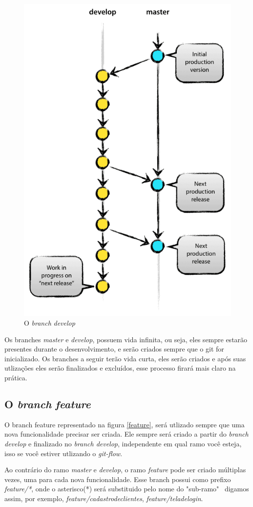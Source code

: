 \documentclass[12pt,openright,oneside,a4paper,english,brazil]{abntex2}
\begin{document}
\begin{figure}[h]
	\caption{\label{develop}O \textit{branch} \textit{develop}}
	\begin{center}
		\includegraphics[width=0.6\linewidth]{develop}
	\end{center}
\end{figure}
	
Os branches \textit{master} e \textit{develop}, possuem vida infinita, ou seja, eles sempre estarão presentes durante o desenvolvimento, e serão criados sempre que o git for inicializado. Os branches a seguir terão vida curta, eles serão criados e após suas utlizações eles serão finalizados e excluídos, esse processo firará mais claro na prática.

\subsection{O \textit{branch} \textit{feature}}

O branch feature representado na figura \ref{feature}, será utlizado sempre que uma nova funcionalidade precisar ser criada. Ele sempre será criado a partir do\textit{ branch develop} e finalizado no \textit{branch develop}, independente em qual ramo você esteja, isso se você estiver utlizando o \textit{git-flow}.

Ao contrário do ramo \textit{master} e \textit{develop}, o ramo \textit{feature} pode ser criado múltiplas vezes, uma para cada nova funcionalidade. Esse branch possui como prefixo \textit{feature/*}, onde o asterisco(*) será substituido pelo nome do "sub-ramo" \ digamos assim, por exemplo, \textit{feature/cadastrodeclientes}, \textit{feature/teladelogin}.
\end{document}
